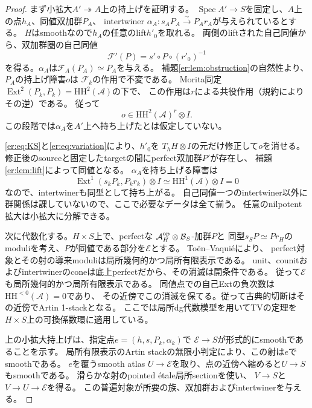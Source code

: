 \begin{proof}
まず小拡大$A'\twoheadrightarrow A$上の持上げを証明する。
$\operatorname{Spec}A'\to S$を固定し、$A$上の点$h_A$、同値双加群$P_A$、
intertwiner $\alpha_A:s_AP_A\xrightarrow{\sim}P_Ar_A$が与えられているとする。
$H$はsmoothなので$h_A$の任意のlift$h'_0$を取れる。
両側のliftされた自己同値から、双加群圏の自己同値
\[
 \mathcal F'(P)=s'\circ P\circ(r'_0)^{-1}
\]
を得る。$\alpha_A$は$\mathcal F_A(P_A)\simeq P_A$を与える。
補題\ref{er:lem:obstruction}の自然性より、$P_A$の持上げ障害$o$は
$\mathcal F_k$の作用で不変である。
Morita同定$\operatorname{Ext}^2(P_k,P_k)=\mathrm{HH}^2(\mathcal A)$の下で、
この作用は$r$による共役作用（規約によりその逆）である。
従って
\[
 o\in\mathrm{HH}^2(\mathcal A)^r\otimes I.
 \tag{I}\label{er:eq:invariant}
\]
この段階では$\alpha_A$を$A'$上へ持ち上げたとは仮定していない。

\eqref{er:eq:KS}と\eqref{er:eq:variation}により、$h'_0$を
$T_hH\otimes I$の元だけ修正して$o$を消せる。
修正後のsourceと固定したtargetの間にperfect双加群$P'$が存在し、
補題\ref{er:lem:lift}によって同値となる。
$\alpha_A$を持ち上げる障害は
\[
 \operatorname{Ext}^1(s_kP_k,P_kr_k)\otimes I
       \simeq \mathrm{HH}^1(\mathcal A)\otimes I=0
\]
なので、intertwinerも同型として持ち上がる。
自己同値一つのintertwiner以外に群関係は課していないので、ここで必要なデータは全て揃う。
任意のnilpotent拡大は小拡大に分解できる。

次に代数化する。$H\times S$上で、perfectな
$\mathcal A_H^{\rm op}\otimes\mathcal B_S$-加群$P$と
同型$s_SP\simeq Pr_H$のmoduliを考え、$P$が同値である部分を$\mathcal E$とする。
Toën--Vaquié\cite[Theorem 3.6, Corollaries 3.15, 3.19]{TV}により、
perfect対象とその射の導来moduliは局所幾何的かつ局所有限表示である。
unit、counitおよびintertwinerのconeは底上perfectだから、その消滅は開条件である。
従って$\mathcal E$も局所幾何的かつ局所有限表示である。
同値点での自己Extの負次数は$\mathrm{HH}^{<0}(\mathcal A)=0$であり、
その近傍でこの消滅を保てる。従って古典的切断はその近傍でArtin 1-stackとなる。
ここでは局所dg代数模型を用いてTVの定理を$H\times S$上の可換係数環に適用している。

上の小拡大持上げは、指定点$e=(h,s,P_k,\alpha_k)$で
$\mathcal E\to S$が形式的にsmoothであることを示す。
局所有限表示のArtin stackの無限小判定により、この射は$e$でsmoothである。
$e$を覆うsmooth atlas $U\to\mathcal E$を取り、点の近傍へ縮めると$U\to S$もsmoothである。
滑らかな射のpointed étale局所section\cite[Tags 02HX, 055U]{StacksER}を使い、
$V\to S$と$V\to U\to\mathcal E$を得る。
この普遍対象が所要の族、双加群およびintertwinerを与える。
\end{proof}

